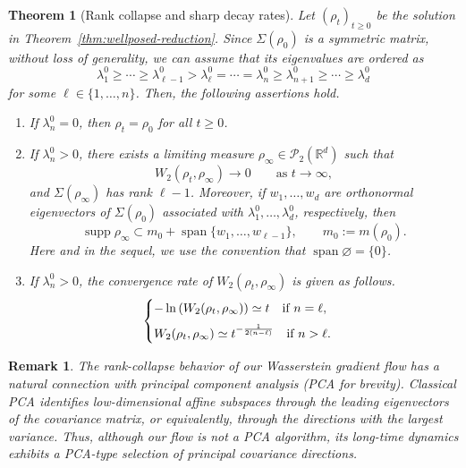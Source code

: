 \documentclass[11pt,reqno]{amsart}
\numberwithin{figure}{section}
\newtheorem{theorem}{Theorem}[section]
\newtheorem{remark}{Remark}[section]
\begin{document}
\begin{theorem}[Rank collapse and sharp decay rates]
	\label{thm:long-time-rates}
	Let $(\rho_t)_{t\ge0}$ be the solution in
	Theorem~\ref{thm:wellposed-reduction}. Since $\Sigma(\rho_0)$ is a symmetric matrix, without loss of generality, we can assume that its eigenvalues are ordered as
       \[
	\lambda_1^0\ge\cdots\ge\lambda_{\ell-1}^0
	>
	\lambda_\ell^0=\cdots=\lambda_n^0
	\ge
	\lambda_{n+1}^0\ge\cdots\ge\lambda_d^0
	\]
    for some $\ell\in\{1,\dots,n\}$. Then, the following assertions hold. 
    \begin{enumerate}
    \item If \(\lambda_n^0=0\), then \(\rho_t=\rho_0\) for all \(t\ge0\).
    \item If \(\lambda_n^0>0\), there exists a limiting measure
	$\rho_\infty\in\mathcal P_2(\mathbb R^d)$ such that
	\[
	W_2(\rho_t,\rho_\infty)\to0
	\qquad\text{as }t\to\infty,
	\]
    and $\Sigma(\rho_\infty)$ has rank $\ell-1$. Moreover, if \(w_1,\dots,w_d\) are orthonormal eigenvectors of
\(\Sigma(\rho_0)\) associated with
\(\lambda_1^0,\dots,\lambda_d^0\), respectively, then
\[
\operatorname{supp}\rho_\infty
\subset
m_0+\operatorname{span}\{w_1,\dots,w_{\ell-1}\},
\qquad m_0:=m(\rho_0).
\]
Here and in the sequel, we use the convention that
\(\operatorname{span}\varnothing=\{0\}\).
    \item If \(\lambda_n^0>0\), the convergence rate of $W_2(\rho_t, \rho_\infty)$ is given as follows.
    \[
    \begin{cases}
    \displaystyle-\ln\left(W_2(\rho_t,\rho_\infty)\right)\simeq t\quad\text{if }n=\ell,\vspace{0.2cm}\\
    \displaystyle W_2(\rho_t, \rho_\infty)\simeq t^{-\frac{1}{2(n-\ell)}}\quad\text{if }n>\ell.
    \end{cases}
    \]
    \end{enumerate}
\end{theorem}



\begin{remark}
The rank-collapse behavior of our Wasserstein gradient flow has a natural connection with principal component analysis (PCA for brevity). Classical PCA identifies low-dimensional affine subspaces through the leading eigenvectors of the covariance matrix, or equivalently, through the directions with the largest variance. Thus, although our flow is not a PCA algorithm, its long-time dynamics exhibits a PCA-type selection of principal covariance directions. 
\end{remark}
\end{document}
